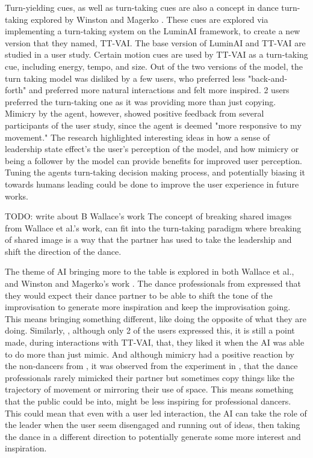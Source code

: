 Turn-yielding cues, as well as turn-taking cues are also a concept in dance turn-taking explored by Winston and Magerko
\cite{Winston2017}. These cues are explored via implementing a
turn-taking system on the LuminAI framework, to create a new version
that they named, TT-VAI. The base version of LuminAI and TT-VAI are
studied in a user study. Certain motion cues are used by TT-VAI as a
turn-taking cue, including energy, tempo, and size. Out of the two versions of the
model, the turn taking model was disliked by a few users, who preferred
less "back-and-forth" and preferred more natural interactions and felt
more inspired. 2 users preferred the turn-taking one as it was providing
more than just copying. Mimicry by the agent, however, showed positive
feedback from several participants of the user study, since the agent is
deemed "more responsive to my movement." The research highlighted
interesting ideas in how a sense of leadership state effect's the user's
perception of the model, and how mimicry or being a follower by the
model can provide benefits for improved user perception. Tuning the
agents turn-taking decision making process, and potentially biasing it
towards humans leading could be done to improve the user experience in
future works.

TODO: write about B Wallace's work
The concept of breaking shared images from Wallace et al.'s work, can
fit into the turn-taking paradigm where breaking of shared image is a
way that the partner has used to take the leadership and shift the
direction of the dance.

The theme of AI bringing more to the table is explored in both Wallace
et al., and Winston and Magerko's work \cite{Wallace2023Embody,
Winston2017}. The dance professionals from \cite{Wallace2023Embody}
expressed that they would expect their dance partner to be able to shift
the tone of the improvisation to generate more inspiration and keep the
improvisation going. This means bringing something different, like doing
the opposite of what they are doing. Similarly, \cite{Winston2017},
although only 2 of the users expressed this, it is still a point made,
during interactions with TT-VAI, that, they liked it when the AI was
able to do more than just mimic. And although mimicry
had a positive reaction by the non-dancers from \cite{Winston2017}, it
was observed from the experiment in \cite{Wallace2023Embody}, that the
dance professionals rarely mimicked their partner but sometimes copy
things like the trajectory of movement or mirroring their use of space.
This means something that the public could be into, might be less
inspiring for professional dancers. This could mean that even with a
user led interaction, the AI can take the role of the leader when the
user seem disengaged and running out of ideas, then taking the dance in
a different direction to potentially generate some more interest and inspiration.

